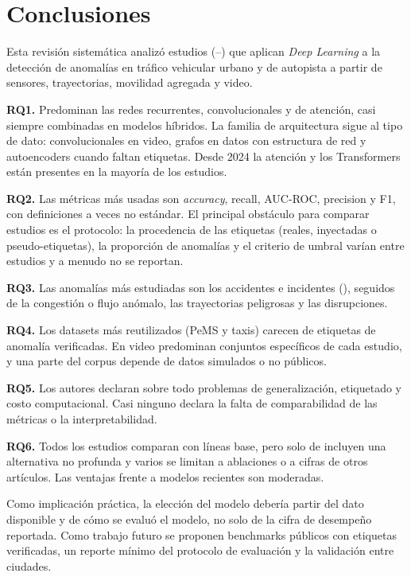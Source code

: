 \documentclass[12pt, a4paper]{article}
\begin{document}
\section{Conclusiones}
\label{sec:conclusiones}

Esta revisi\'{o}n sistem\'{a}tica analiz\'{o} \Nestudios{} estudios (\AnioMin--\AnioMax) que aplican \textit{Deep Learning} a la detecci\'{o}n de anomal\'{i}as en tr\'{a}fico vehicular urbano y de autopista a partir de sensores, trayectorias, movilidad agregada y video.

\textbf{RQ1.} Predominan las redes recurrentes, convolucionales y de atenci\'{o}n, casi siempre combinadas en modelos h\'{i}bridos. La familia de arquitectura sigue al tipo de dato: convolucionales en video, grafos en datos con estructura de red y autoencoders cuando faltan etiquetas. Desde 2024 la atenci\'{o}n y los Transformers est\'{a}n presentes en la mayor\'{i}a de los estudios.

\textbf{RQ2.} Las m\'{e}tricas m\'{a}s usadas son \textit{accuracy}, recall, AUC-ROC, precision y F1, con definiciones a veces no est\'{a}ndar. El principal obst\'{a}culo para comparar estudios es el protocolo: la procedencia de las etiquetas (reales, inyectadas o pseudo-etiquetas), la proporci\'{o}n de anomal\'{i}as y el criterio de umbral var\'{i}an entre estudios y a menudo no se reportan.

\textbf{RQ3.} Las anomal\'{i}as m\'{a}s estudiadas son los accidentes e incidentes (\PcatA), seguidos de la congesti\'{o}n o flujo an\'{o}malo, las trayectorias peligrosas y las disrupciones.

\textbf{RQ4.} Los datasets m\'{a}s reutilizados (PeMS y taxis) carecen de etiquetas de anomal\'{i}a verificadas. En video predominan conjuntos espec\'{i}ficos de cada estudio, y una parte del corpus depende de datos simulados o no p\'{u}blicos.

\textbf{RQ5.} Los autores declaran sobre todo problemas de generalizaci\'{o}n, etiquetado y costo computacional. Casi ninguno declara la falta de comparabilidad de las m\'{e}tricas o la interpretabilidad.

\textbf{RQ6.} Todos los estudios comparan con l\'{i}neas base, pero solo \NbaselineNoDL{} de \Nestudios{} incluyen una alternativa no profunda y varios se limitan a ablaciones o a cifras de otros art\'{i}culos. Las ventajas frente a modelos recientes son moderadas.

Como implicaci\'{o}n pr\'{a}ctica, la elecci\'{o}n del modelo deber\'{i}a partir del dato disponible y de c\'{o}mo se evalu\'{o} el modelo, no solo de la cifra de desempe\~{n}o reportada. Como trabajo futuro se proponen benchmarks p\'{u}blicos con etiquetas verificadas, un reporte m\'{i}nimo del protocolo de evaluaci\'{o}n y la validaci\'{o}n entre ciudades.
\end{document}
